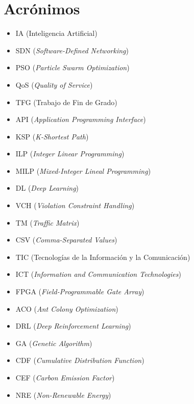 \chapter{Acrónimos}\label{sec:acronimos}

\begin{itemize}
    \item IA (Inteligencia Artificial)
    \item SDN (\textit{Software-Defined Networking})
    \item PSO (\textit{Particle Swarm Optimization})
    \item QoS (\textit{Quality of Service})
    \item TFG (Trabajo de Fin de Grado)
    \item API (\textit{Application Programming Interface})
    \item KSP (\textit{K-Shortest Path})
    \item ILP (\textit{Integer Linear Programming})
    \item MILP (\textit{Mixed-Integer Lineal Programming})
    \item DL (\textit{Deep Learning})
    \item VCH (\textit{Violation Constraint Handling})
    \item TM (\textit{Traffic Matrix})
    \item CSV (\textit{Comma-Separated Values})
    \item TIC (Tecnologías de la Información y la Comunicación)
    \item ICT (\textit{Information and Communication Technologies})
    \item FPGA (\textit{Field-Programmable Gate Array})
    \item ACO (\textit{Ant Colony Optimization})
    \item DRL (\textit{Deep Reinforcement Learning})
    \item GA (\textit{Genetic Algorithm})
    \item CDF (\textit{Cumulative Distribution Function})
    \item CEF (\textit{Carbon Emission Factor})
    \item NRE (\textit{Non-Renewable Energy})
\end{itemize}